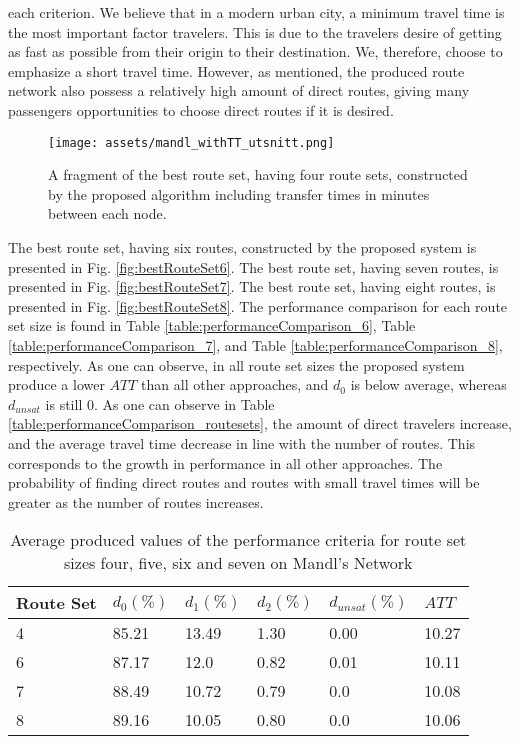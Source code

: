 each criterion. We believe that in a modern urban city, a minimum travel time is the most important factor travelers. This is due to the travelers desire of getting as fast as possible from their origin to their destination. We, therefore, choose to emphasize a short travel time. However, as mentioned, the produced route network also possess a relatively high amount of direct routes, giving many passengers opportunities to choose direct routes if it is desired. 

\begin{figure}[H]
    \begin{center}
    \texttt{[image: assets/mandl\_withTT\_utsnitt.png]}
    \end{center}
    \caption{A fragment of the best route set, having four route sets, constructed by the proposed algorithm including transfer times in minutes between each node.}
    \label{fig:mandlWithTT} 
\end{figure}

The best route set, having six routes, constructed by the proposed system is presented in Fig. \vref{fig:bestRouteSet6}. The best route set, having seven routes, is presented in Fig. \vref{fig:bestRouteSet7}. The best route set, having eight routes, is presented in Fig. \vref{fig:bestRouteSet8}. The performance comparison for each route set size is found in Table \vref{table:performanceComparison_6}, Table \vref{table:performanceComparison_7}, and Table \vref{table:performanceComparison_8}, respectively. As one can observe, in all route set sizes the proposed system produce a lower $ATT$ than all other approaches, and $d_0$ is below average, whereas $d_{unsat}$ is still 0. As one can observe in Table \vref{table:performanceComparison_routesets}, the amount of direct travelers increase, and the average travel time decrease in line with the number of routes. This corresponds to the growth in performance in all other approaches. The probability of finding direct routes and routes with small travel times will be greater as the number of routes increases. 

 \begin{table}[H]
    \centering
    \begin{tabular}{|l|l|l|l|l|l|}
    \hline
    Route Set & $d_0(\%)$ & $d_1(\%)$ & $d_2(\%)$ & $d_{unsat}(\%)$ & $ATT$ \\
    \hline
    4 & 85.21 & 13.49 & 1.30 & 0.00 & 10.27\\
    6 & 87.17 & 12.0 & 0.82 & 0.01 & 10.11\\
    7 & 88.49 & 10.72 & 0.79 & 0.0 & 10.08\\
    8 & 89.16 & 10.05 & 0.80 & 0.0 & 10.06\\
    \hline
    \end{tabular}
    \caption {Average produced values of the performance criteria for route set sizes four, five, six and seven on Mandl's Network}
    \label{table:performanceComparison_routesets}
\end{table}







